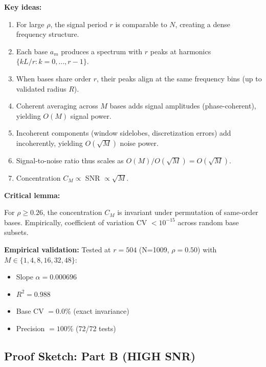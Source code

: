 \textbf{Key ideas:}
\begin{enumerate}
    \item For large $\rho$, the signal period $r$ is comparable to $N$, creating a dense frequency structure.
    \item Each base $a_m$ produces a spectrum with $r$ peaks at harmonics $\{kL/r : k=0,\ldots,r-1\}$.
    \item When bases share order $r$, their peaks align at the same frequency bins (up to validated radius $R$).
    \item Coherent averaging across $M$ bases adds signal amplitudes (phase-coherent), yielding $O(M)$ signal power.
    \item Incoherent components (window sidelobes, discretization errors) add incoherently, yielding $O(\sqrt{M})$ noise power.
    \item Signal-to-noise ratio thus scales as $O(M) / O(\sqrt{M}) = O(\sqrt{M})$.
    \item Concentration $C_M \propto$ SNR $\propto \sqrt{M}$.
\end{enumerate}

\textbf{Critical lemma:}
\begin{lemma}
For $\rho \geq 0.26$, the concentration $C_M$ is invariant under permutation of same-order bases. Empirically, coefficient of variation CV $< 10^{-15}$ across random base subsets.
\end{lemma}

\textbf{Empirical validation:}
Tested at $r=504$ (N=1009, $\rho=0.50$) with $M \in \{1,4,8,16,32,48\}$:
\begin{itemize}
    \item Slope $\alpha = 0.000696$
    \item $R^2 = 0.988$
    \item Base CV $= 0.0\%$ (exact invariance)
    \item Precision $= 100\%$ (72/72 tests)
\end{itemize}

\subsection{Proof Sketch: Part B (HIGH SNR)}

